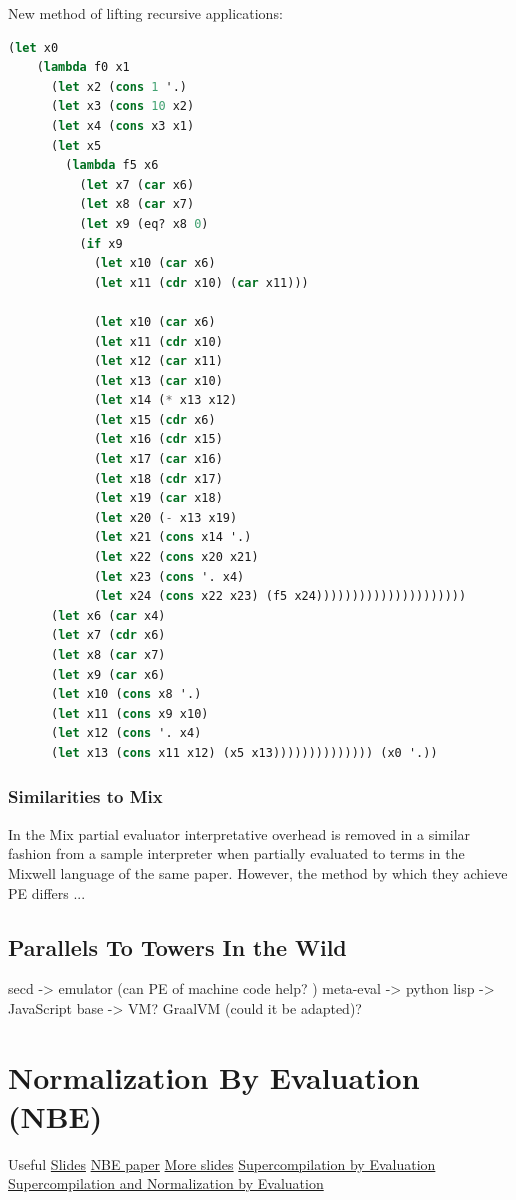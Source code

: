 \documentclass[fleqn]{article}
\theoremstyle{definition}
\begin{document}
New method of lifting recursive applications:
\begin{lstlisting}[language=Lisp]
	(let x0
	(lambda f0 x1
	  (let x2 (cons 1 '.)
	  (let x3 (cons 10 x2)
	  (let x4 (cons x3 x1)
	  (let x5
		(lambda f5 x6
		  (let x7 (car x6)
		  (let x8 (car x7)
		  (let x9 (eq? x8 0)
		  (if x9
			(let x10 (car x6)
			(let x11 (cdr x10) (car x11)))
  
			(let x10 (car x6)
			(let x11 (cdr x10)
			(let x12 (car x11)
			(let x13 (car x10)
			(let x14 (* x13 x12)
			(let x15 (cdr x6)
			(let x16 (cdr x15)
			(let x17 (car x16)
			(let x18 (cdr x17)
			(let x19 (car x18)
			(let x20 (- x13 x19)
			(let x21 (cons x14 '.)
			(let x22 (cons x20 x21)
			(let x23 (cons '. x4)
			(let x24 (cons x22 x23) (f5 x24)))))))))))))))))))))
	  (let x6 (car x4)
	  (let x7 (cdr x6)
	  (let x8 (car x7)
	  (let x9 (car x6)
	  (let x10 (cons x8 '.)
	  (let x11 (cons x9 x10)
	  (let x12 (cons '. x4)
	  (let x13 (cons x11 x12) (x5 x13)))))))))))))) (x0 '.))
\end{lstlisting}

\subsubsection{Similarities to Mix}
In the Mix partial evaluator \cite{jones1989mix} interpretative overhead is removed in a similar fashion from a sample interpreter when partially evaluated to terms in the Mixwell language of the same paper. However, the method by which they achieve PE differs ...

\subsection{Parallels To Towers In the Wild}
secd -> emulator (can PE of machine code help? \cite{srinivasan2015partial})
meta-eval -> python
lisp -> JavaScript
base -> VM? GraalVM (could it be adapted)?

\section{Normalization By Evaluation (NBE)}
Useful \href{http://cs.ioc.ee/ewscs/2009/dybjer/mainPalmse-revised.pdf}{Slides}
\href{http://www.cse.chalmers.se/~abela/univnbe.pdf}{NBE paper}
\href{http://homepages.inf.ed.ac.uk/slindley/nbe/nbe-cambridge2016.pdf}{More slides}
\href{https://www.microsoft.com/en-us/research/wp-content/uploads/2016/07/supercomp-by-eval.pdf?from=http%3A%2F%2Fresearch.microsoft.com%2Fen-us%2Fum%2Fpeople%2Fsimonpj%2Fpapers%2Fsupercompilation%2Fsupercomp-by-eval.pdf}{Supercompilation by Evaluation}
\href{http://citeseerx.ist.psu.edu/viewdoc/download?doi=10.1.1.630.2123&rep=rep1&type=pdf}{Supercompilation and Normalization by Evaluation}
\end{document}
